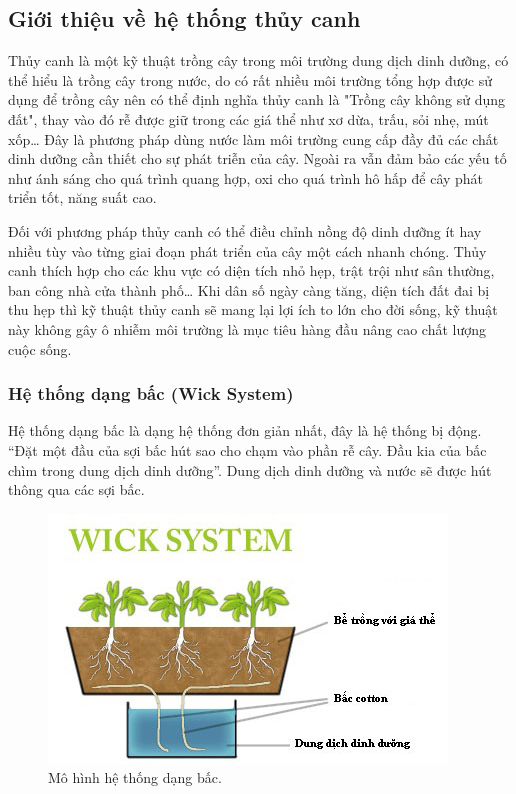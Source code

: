 \documentclass[a4paper,12pt,oneside]{article}
\begin{document}
\subsection{Giới thiệu về hệ thống thủy canh\cite{thuycanh}}

\noindent Thủy canh là một kỹ thuật trồng cây trong môi trường dung dịch dinh dưỡng, có thể hiểu là trồng cây trong nước, do có rất nhiều môi trường tổng hợp được sử dụng để trồng cây nên có thể định nghĩa thủy canh là "Trồng cây không sử dụng đất"\cite{thuycanh}, thay vào đó rễ được giữ trong các giá thể như xơ dừa, trấu, sỏi nhẹ, mút xốp… Đây là phương pháp dùng nước làm môi trường cung cấp đầy đủ các chất dinh dưỡng cần thiết cho sự phát triễn của cây. Ngoài ra vẫn đảm bảo các yếu tố như ánh sáng cho quá trình quang hợp, oxi cho quá trình hô hấp để cây phát triển tốt, năng suất cao. 

\noindent Đối với phương pháp thủy canh có thể điều chỉnh nồng độ dinh dưỡng ít hay nhiều tùy vào từng giai đoạn phát triển của cây một cách nhanh chóng. Thủy canh thích hợp cho các khu vực có diện tích nhỏ hẹp, trật trội như sân thường, ban công nhà cửa thành phố… Khi dân số ngày càng tăng, diện tích đất đai bị thu hẹp thì kỹ thuật thủy canh sẽ mang lại lợi ích to lớn cho đời sống, kỹ thuật này không gây ô nhiễm môi trường là mục tiêu hàng đầu nâng cao chất lượng cuộc sống.

\subsubsection{Hệ thống dạng bấc (Wick System)}
\noindent Hệ thống dạng bấc là dạng hệ thống đơn giản nhất, đây là hệ thống bị động. “Đặt một đầu của sợi bấc hút sao cho chạm vào phần rễ cây. Đầu kia của bấc chìm trong dung dịch dinh dưỡng”\cite{thuycanh}. Dung dịch dinh dưỡng và nước sẽ được hút thông qua các sợi bấc.

\begin{figure}[H]
	\centering
	\includegraphics[scale=.8]{hinh/Wick_system.jpg}
	\caption{Mô hình hệ thống dạng bấc\cite{thuycanh}.}
	\label{fig:Wick_system}
\end{figure}
\end{document}
